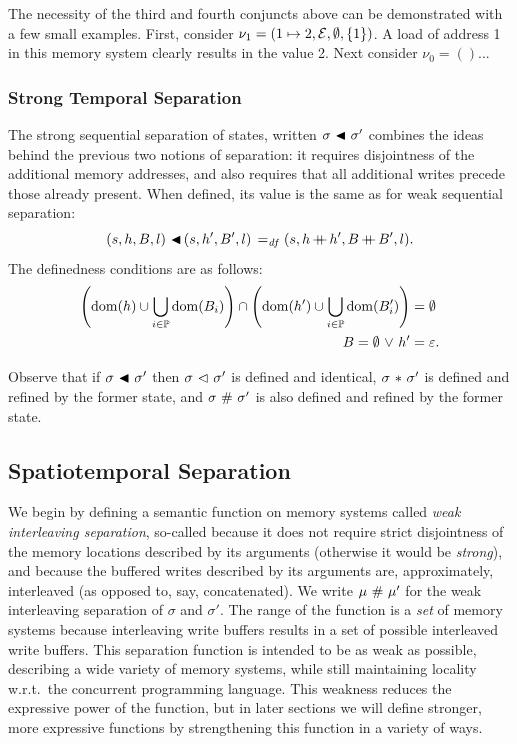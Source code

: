 \documentclass[11pt]{report}
\begin{document}
The necessity of the third and fourth conjuncts above can be demonstrated with a few small examples. First, consider $\nu_1 = (1 \mapsto 2, \mathcal{E}, \operatorname{\emptyset}, \left\lbrace 1 \right\rbrace)$. A load of address 1 in this memory system clearly results in the value 2. Next consider $\nu_0 = ()$... 



\subsubsection{Strong Temporal Separation}

The strong sequential separation of states, written $\sigma \operatorname{\,\blacktriangleleft\,} \sigma'$ combines the ideas behind the previous two notions of separation: it requires disjointness of the additional memory addresses, and also requires that all additional writes precede those already present. When defined, its value is the same as for weak sequential separation: \[ (s,h,B,l) \operatorname{\,\blacktriangleleft\,} (s,h',B',l) \operatorname{\;=_{\mathit{df}}\;} (s,h \operatorname{+\!\!\!+} h', B \operatorname{+\!\!\!+} B',l).\] The definedness conditions are as follows: \begin{align*}
  \left(\operatorname{\mathrm{dom}}(h) \cup \bigcup_{i \in \mathbb{P}} \operatorname{\mathrm{dom}}(B_i) \right) \cap \left( \operatorname{\mathrm{dom}}(h') \cup \bigcup_{i \in \mathbb{P}} \operatorname{\mathrm{dom}}(B'_i)\right) & = \operatorname{\emptyset} \\ B = \operatorname{\emptyset} \operatorname{\,\vee\,} h' & = \varepsilon.
\end{align*}

Observe that if $\sigma \operatorname{\,\blacktriangleleft\,} \sigma'$ then $\sigma \operatorname{\,\vartriangleleft\,} \sigma'$ is defined and identical, $\sigma \operatorname{\,\ast\,} \sigma'$ is defined and refined by the former state, and $\sigma \operatorname{\,\#\,} \sigma'$ is also defined and refined by the former state.

\subsection{Spatiotemporal Separation}
\label{sec:spatiotemporal-separation}

We begin by defining a semantic function on memory systems called \emph{weak interleaving separation}, so-called because it does not require strict disjointness of the memory locations described by its arguments (otherwise it would be \emph{strong}), and because the buffered writes described by its arguments are, approximately, interleaved (as opposed to, say, concatenated). 
We write $\mu \operatorname{\,\#\,} \mu'$ for the weak interleaving separation of $\sigma$ and $\sigma'$. The range of the function is a \emph{set} of memory systems because interleaving write buffers results in a set of possible interleaved write buffers. This separation function is intended to be as weak as possible, describing a wide variety of memory systems, while still maintaining locality w.r.t.\ the concurrent programming language. This weakness reduces the expressive power of the function, but in later sections we will define stronger, more expressive functions by strengthening this function in a variety of ways. 
\end{document}
